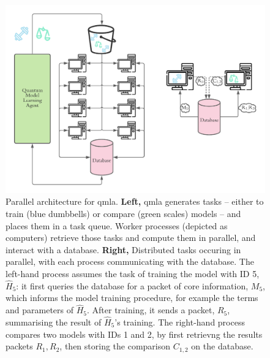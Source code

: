 \begin{figure}
    \includegraphics{algorithms/figures/parallel_architecture.pdf}
    \caption[Parallel architecture for QMLA]{
        Parallel architecture for \acrfull{qmla}.
        \textbf{Left,} \gls{qmla} generates tasks 
            -- either to train (blue dumbbells) or compare (green scales) models -- 
            and places them in a task queue. 
        Worker processes (depicted as computers) retrieve those tasks and compute them in parallel, 
            and interact with a database. 
        \textbf{Right,} Distributed tasks occuring in parallel, with each process communicating with the database. 
        The left-hand process assumes the task of training the model with ID 5, $\hat{H}_5$:
            it first queries the database for a packet of core information, $M_5$, 
            which informs the model training procedure, for example the terms and parameters 
            of $\hat{H}_5$. 
        After training, it sends a packet, $R_5$, summarising the result of $\hat{H}_5$'s training. 
        The right-hand process compares two models with IDs 1 and 2, by first retrievng the results packets
            $R_1, R_2$, then storing the comparison $C_{1,2}$ on the database. 
    }
    \label{fig:parallel}
\end{figure}

